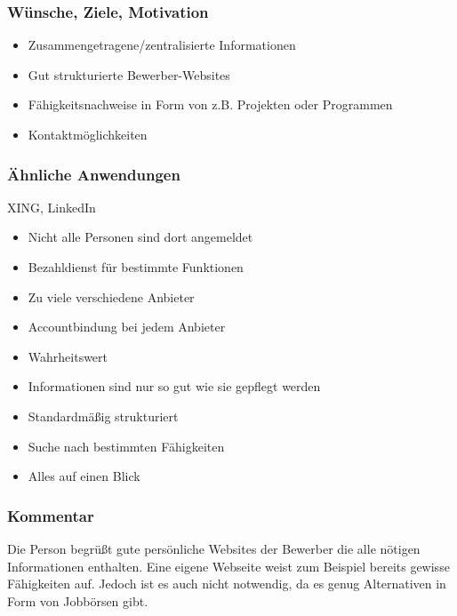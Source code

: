 \begin{minipage}[t][][b]{.45\textwidth}
\subsubsection*{Wünsche, Ziele, Motivation}%
\begin{itemize}[leftmargin=*]
\item Zusammengetragene/zentralisierte Informationen
\item Gut strukturierte Bewerber-Websites
\item Fähigkeitsnachweise in Form von z.B. Projekten oder Programmen
\item Kontaktmöglichkeiten
\end{itemize}
\end{minipage}\hfill
%
\begin{minipage}[t][][b]{.45\textwidth}
\subsubsection*{Ähnliche Anwendungen}
XING, LinkedIn
\begin{itemize}[leftmargin=*,label={$-$}]
\item Nicht alle Personen sind dort angemeldet
\item Bezahldienst für bestimmte Funktionen
\item Zu viele verschiedene Anbieter
\item Accountbindung bei jedem Anbieter
\item Wahrheitswert
\item Informationen sind nur so gut wie sie gepflegt werden
\end{itemize}
\begin{itemize}[leftmargin=*,label={$+$}]
\item Standardmäßig strukturiert
\item Suche nach bestimmten Fähigkeiten
\item Alles auf einen Blick
\end{itemize}
\end{minipage}\bigskip

\subsubsection*{Kommentar}
Die Person begrüßt gute persönliche Websites der Bewerber die alle nötigen Informationen enthalten. Eine eigene Webseite weist zum Beispiel bereits gewisse Fähigkeiten auf. Jedoch ist es auch nicht notwendig, da es genug Alternativen in Form von Jobbörsen gibt.

